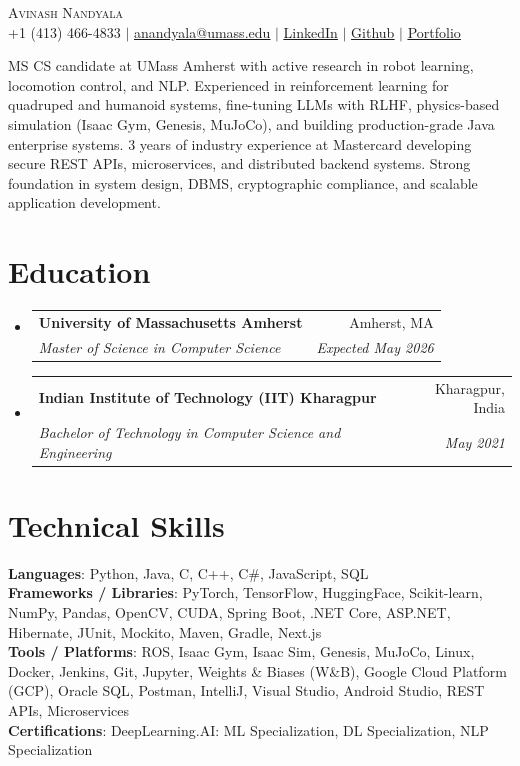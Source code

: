 \documentclass[letterpaper,11pt]{article}
\makeatletter
\newcommand{\resumeSubheading}[4]{
  \vspace{-2pt}\item
    \begin{tabular*}{0.97\textwidth}[t]{l@{\extracolsep{\fill}}r}
      \textbf{#1} & #2 \\
      \textit{\small#3} & \textit{\small #4} \\
    \end{tabular*}\vspace{-7pt}
}
\newcommand{\resumeSubHeadingListStart}{\begin{itemize}[leftmargin=0.15in, label={}]}
\newcommand{\resumeSubHeadingListEnd}{\end{itemize}}
\makeatother
\begin{document}
\begin{center}
  {\Huge\textsc{Avinash Nandyala}} \\ \vspace{1pt}
  \small +1 (413) 466-4833 $|$ \href{mailto:anandyala@umass.edu}{\underline{anandyala@umass.edu}} $|$
  \href{https://www.linkedin.com/in/avinash-nandyala-06a88b199/}{\underline{LinkedIn}} $|$
  \href{https://github.com/navinash47}{\underline{Github}} $|$
  \href{https://navinash47.github.io/Portfolio/}{\underline{Portfolio}}
\end{center}

\begin{center}
  \small{MS CS candidate at UMass Amherst with active research in robot learning, locomotion control, and NLP. Experienced in reinforcement learning for quadruped and humanoid systems, fine-tuning LLMs with RLHF, physics-based simulation (Isaac Gym, Genesis, MuJoCo), and building production-grade Java enterprise systems. 3 years of industry experience at Mastercard developing secure REST APIs, microservices, and distributed backend systems. Strong foundation in system design, DBMS, cryptographic compliance, and scalable application development.}
\end{center}

\section{Education}
\resumeSubHeadingListStart
  \resumeSubheading
    {University of Massachusetts Amherst}{Amherst, MA}
    {Master of Science in Computer Science}{Expected May 2026}
  \resumeSubheading
    {Indian Institute of Technology (IIT) Kharagpur}{Kharagpur, India}
    {Bachelor of Technology in Computer Science and Engineering}{May 2021}
\resumeSubHeadingListEnd


\section{Technical Skills}
\begin{itemize}[leftmargin=0.15in, label={}]
  \small{\item{
    \textbf{Languages}{: Python, Java, C, C++, C\#, JavaScript, SQL} \\
    \textbf{Frameworks / Libraries}{: PyTorch, TensorFlow, HuggingFace, Scikit-learn, NumPy, Pandas, OpenCV, CUDA, Spring Boot, .NET Core, ASP.NET, Hibernate, JUnit, Mockito, Maven, Gradle, Next.js} \\
    \textbf{Tools / Platforms}{: ROS, Isaac Gym, Isaac Sim, Genesis, MuJoCo, Linux, Docker, Jenkins, Git, Jupyter, Weights \& Biases (W\&B), Google Cloud Platform (GCP), Oracle SQL, Postman, IntelliJ, Visual Studio, Android Studio, REST APIs, Microservices} \\
    \textbf{Certifications}{: DeepLearning.AI: ML Specialization, DL Specialization, NLP Specialization}
  }}
\end{itemize}
\end{document}
